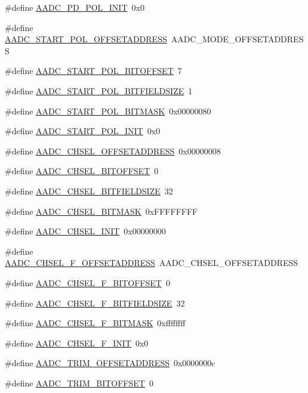 \begin{DoxyCompactItemize}
\#define \hyperlink{a00543_ae98c3aa321aa9f2aa5070cc718d5baa1}{AADC\_\-PD\_\-POL\_\-INIT}~0x0
\item 
\#define \hyperlink{a00543_a58cec959afd0a2b2f21a0bee6194dc4b}{AADC\_\-START\_\-POL\_\-OFFSETADDRESS}~AADC\_\-MODE\_\-OFFSETADDRESS
\item 
\#define \hyperlink{a00543_aa7fd7c3b2cec8bb6f60d98c73d8ba6fc}{AADC\_\-START\_\-POL\_\-BITOFFSET}~7
\item 
\#define \hyperlink{a00543_a8177fdac9258054b63d52cee3d9d2f40}{AADC\_\-START\_\-POL\_\-BITFIELDSIZE}~1
\item 
\#define \hyperlink{a00543_a2e7b88caa1e492f49ee9f82536196972}{AADC\_\-START\_\-POL\_\-BITMASK}~0x00000080
\item 
\#define \hyperlink{a00543_a983a6704e332a23c1ee0ebdf03048a37}{AADC\_\-START\_\-POL\_\-INIT}~0x0
\item 
\#define \hyperlink{a00543_ae1c6195f828391a79a7e096959bed63e}{AADC\_\-CHSEL\_\-OFFSETADDRESS}~0x00000008
\item 
\#define \hyperlink{a00543_ad3bf6abb008d5e435605e085318b6a73}{AADC\_\-CHSEL\_\-BITOFFSET}~0
\item 
\#define \hyperlink{a00543_a79f8bdf8c6e19b0670dbbe77ef044f10}{AADC\_\-CHSEL\_\-BITFIELDSIZE}~32
\item 
\#define \hyperlink{a00543_a3884692e3a68b3c3ba453cb3a9cfadcc}{AADC\_\-CHSEL\_\-BITMASK}~0xFFFFFFFF
\item 
\#define \hyperlink{a00543_a6ec0c6f8491b61a2dc511f953e94cf84}{AADC\_\-CHSEL\_\-INIT}~0x00000000
\item 
\#define \hyperlink{a00543_a699b77be1fdd276e6a740195da0d5e05}{AADC\_\-CHSEL\_\-F\_\-OFFSETADDRESS}~AADC\_\-CHSEL\_\-OFFSETADDRESS
\item 
\#define \hyperlink{a00543_ae6e9da493a2732771b7777dfffce66ed}{AADC\_\-CHSEL\_\-F\_\-BITOFFSET}~0
\item 
\#define \hyperlink{a00543_a15de6abf133b5a0f23b1d80a307c1be2}{AADC\_\-CHSEL\_\-F\_\-BITFIELDSIZE}~32
\item 
\#define \hyperlink{a00543_aa2fcfd1a0a6aa9f1848c42211fd91621}{AADC\_\-CHSEL\_\-F\_\-BITMASK}~0xffffffff
\item 
\#define \hyperlink{a00543_a87adc2c0a6199bc0f20c73189f8d5182}{AADC\_\-CHSEL\_\-F\_\-INIT}~0x0
\item 
\#define \hyperlink{a00543_a45cf079d3af97bf8a8fd3c014f851b87}{AADC\_\-TRIM\_\-OFFSETADDRESS}~0x0000000c
\item 
\#define \hyperlink{a00543_a8b6462e8c6987af4a7140a63e6cdda05}{AADC\_\-TRIM\_\-BITOFFSET}~0

\end{DoxyCompactItemize}
